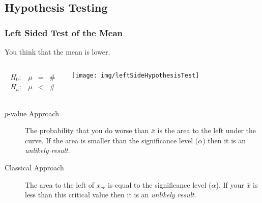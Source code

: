 \subsection{Hypothesis Testing}

\begin{frame}
  \frametitle{Left Sided Test of the Mean}

  You think that the mean is lower.

  \begin{columns}
    \begin{eqnarray*}
      \begin{array}{lrcl}
        H_0: & \mu & = & \# \\
        H_a: & \mu & < & \#
      \end{array}
    \end{eqnarray*}


    \texttt{[image: img/leftSideHypothesisTest]}

  \end{columns}

  \begin{description}
  \item[$p$-value Approach] The probability that you do worse than
    $\bar{x}$ is the area to the left under the curve. If the area is
    smaller than the significance level ($\alpha$) then it is an
    \textit{unlikely result}.
  \item[Classical Approach] The area to the left of $x_{cr}$ is
    equal to the significance level ($\alpha$). If your $\bar{x}$ is
    less than this critical value then it is an \textit{unlikely
      result}.
  \end{description}


\end{frame}

